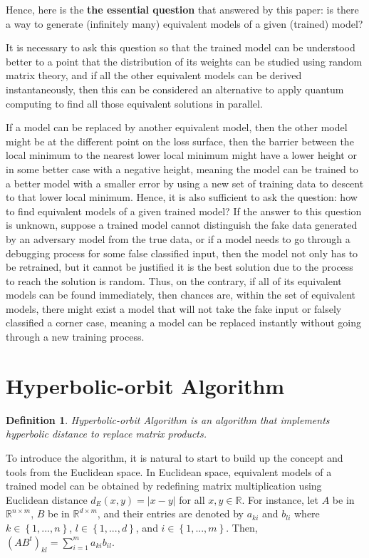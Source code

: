 \documentclass{article}
\theoremstyle{plain}
\theoremstyle{plain} %
\newtheorem{definition}[theorem]{Definition}
\theoremstyle{definition}  %
\theoremstyle{remark}  %
\theoremstyle{plain}
\begin{document}
Hence, here is the \textbf{the essential question} that answered by this paper: is there a way to generate (infinitely many) equivalent models of a given (trained) model? 


It is necessary to ask this question so that the trained model can be understood better to a point that the distribution of its weights can be studied using random matrix theory, and if all the other equivalent models can be derived instantaneously, then this can be considered an alternative to apply quantum computing to find all those equivalent solutions in parallel. 

If a model can be replaced by another equivalent model, then the other model might be at the different point on the loss surface, then the barrier between the local minimum to the nearest lower local minimum might have a lower height or in some better case with a negative height, meaning the model can be trained to a better model with a smaller error by using a new set of training data to descent to that lower local minimum. Hence, it is also sufficient to ask the question: how to find equivalent models of a given trained model? If the answer to this question is unknown, suppose a trained model cannot distinguish the fake data generated by an adversary model from the true data, or if a model needs to go through a debugging process for some false classified input, then the model not only has to be retrained, but it cannot be justified it is the best solution due to the process to reach the solution is random. Thus, on the contrary, if all of its equivalent models can be found immediately, then chances are, within the set of equivalent models, there might exist a model that will not take the fake input or falsely classified a corner case, meaning a model can be replaced instantly without going through a new training process.


\section{Hyperbolic-orbit Algorithm}
\begin{definition}
Hyperbolic-orbit Algorithm is an algorithm that implements hyperbolic distance to replace matrix products.
\end{definition}
To introduce the algorithm, it is natural to start to build up the concept and tools from the Euclidean space. In Euclidean space, equivalent models of a trained model can be obtained by redefining matrix multiplication using Euclidean distance $d_E(x,y)=\vert x-y\vert$ for all $x, y\in\mathbb{R}$. For instance, let $A$ be in $\mathbb{R}^{n\times m}$, $B$ be in $\mathbb{R}^{d\times m}$, and their entries are denoted by $a_{ki}$ and $b_{li}$ where $k\in\left\lbrace 1,...,n\right\rbrace$, $l\in\left\lbrace 1,...,d\right\rbrace$, and $i\in\left\lbrace 1,...,m\right\rbrace$. Then, $\left( A B^t\right)_{kl}=\sum\limits_{i=1}^m a_{ki}b_{il}$.
\end{document}
